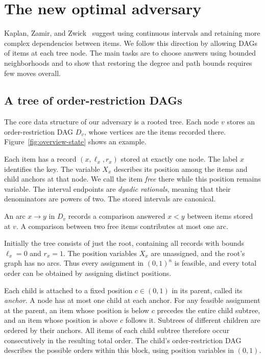 \section{The new optimal adversary}\label{sec:overview}\label{sec:algorithm}

Kaplan, Zamir, and Zwick~\cite[Section~6]{kzz} suggest using continuous
intervals and retaining more complex dependencies between items.
We follow this direction by allowing DAGs of items at each tree node.
The main tasks are to choose answers using bounded neighborhoods and
to show that restoring the degree and path bounds requires few moves
overall.



\subsection{A tree of order-restriction DAGs}

The core data structure of our adversary is a rooted tree. Each node $v$
stores an order-restriction DAG $D_v$, whose vertices are the items
recorded there. Figure~\ref{fig:overview-state} shows an example.

Each item has a record $(x,\ell_x,r_x)$ stored at exactly one node.
The label $x$ identifies the key. The variable $X_x$ describes its
position among the items and child anchors at that node. We call the
item \emph{free} there while this position remains variable.
The interval endpoints are \emph{dyadic rationals}, meaning that their
denominators are powers of two. The stored intervals are canonical.

An arc $x\to y$ in $D_v$ records a comparison answered $x<y$ between
items stored at $v$. A comparison between two free items contributes
at most one arc.

Initially the tree consists of just the root, containing all records
with bounds $\ell_x=0$ and $r_x=1$. The position variables $X_x$ are
unassigned, and the root's graph has no arcs.
Thus every assignment in $(0,1)^n$ is feasible, and every total order
can be obtained by assigning distinct positions.

Each child is attached to a fixed position $c\in(0,1)$ in its parent,
called its \emph{anchor}. A node has at most one child at each anchor.
For any feasible assignment at the parent, an item whose position is
below $c$ precedes the entire child subtree, and an item whose position
is above $c$ follows it. Subtrees of
different children are ordered by their anchors. All items of each child
subtree therefore occur consecutively in the resulting total order.
The child's order-restriction DAG describes the possible orders within this block,
using position variables in $(0,1)$.

